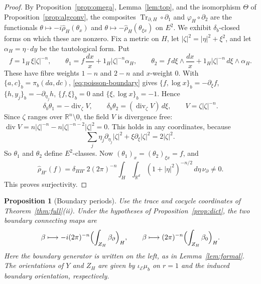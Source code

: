\documentclass[11pt,oneside,reqno]{article}
\DeclareMathOperator{\Tr}{Tr}
\theoremstyle{plain}
\newtheorem{proposition}[theorem]{Proposition}
\theoremstyle{definition}
\theoremstyle{remark}
\begin{document}
\begin{proof}
By Proposition~\ref{prop:omega}, Lemma~\ref{lem:top}, and the isomorphism
\(\Theta\) of Proposition~\ref{prop:algconv}, the composites
\(\Tr_{\partial,H}\circ\partial_1\) and \(\varphi_H\circ\partial_2\) are the
functionals \(\theta\mapsto-i\hat\rho_H(\theta_x)\) and
\(\theta\mapsto-\hat\rho_H(\theta_{\xi x})\) on \(E^2\). We exhibit
\(\delta_b\)-closed forms on which these are nonzero. Fix a metric on
\(H\), let \(|\zeta|^2=|\eta|^2+\xi^2\), and let \(\alpha_H=\eta\cdot dy\) be
the tautological form. Put
\[
 f=1_H\,\xi|\zeta|^{-n},\qquad
 \theta_1=f\,\frac{dx}{x}+1_H|\zeta|^{-n}\alpha_H,\qquad
 \theta_2=f\,d\xi\wedge\frac{dx}{x}+1_H|\zeta|^{-n}\,d\xi\wedge\alpha_H .
\]
These have fibre weights \(1-n\) and \(2-n\) and \(x\)-weight \(0\). With
\(\{a,c\}_b=\pi_b(da,dc)\), \eqref{eq:poisson-boundary} gives
\(\{f,\log x\}_b=-\partial_\xi f\), \(\{h,y_j\}_b=-\partial_{\eta_j}h\),
\(\{f,\xi\}_b=0\) and \(\{\xi,\log x\}_b=-1\). Hence
\[
 \delta_b\theta_1=-\operatorname{div}_\zeta V,\qquad
 \delta_b\theta_2=(\operatorname{div}_\zeta V)\,d\xi,\qquad
 V=\zeta|\zeta|^{-n}.
\]
Since \(\zeta\) ranges over \(\mathbb R^n\setminus0\), the field \(V\) is
divergence free:
\(\operatorname{div}V=n|\zeta|^{-n}-n|\zeta|^{-n-2}|\zeta|^2=0\). This holds
in any coordinates, because
\[
 \sum_j\eta_j\partial_{\eta_j}|\zeta|^2+\xi\partial_\xi|\zeta|^2=2|\zeta|^2 .
\]
So \(\theta_1\) and \(\theta_2\) define
\(E^2\)-classes. Now \((\theta_1)_x=(\theta_2)_{\xi x}=f\), and
\[
 \hat\rho_{H'}(f)=\delta_{HH'}\,2(2\pi)^{-n}\int_H\int_{\mathbb R^d}
 (1+|\eta|^2)^{-n/2}\,d\eta\,\nu_\partial\neq0 .
\]
This proves surjectivity.
\end{proof}

\begin{proposition}[Boundary periods]\label{prop:description}
Use the trace and cocycle coordinates of Theorem~\ref{thm:full}(ii).
Under the hypotheses of Proposition~\ref{prop:dict}, the two boundary
connecting maps are
\[
 \beta\longmapsto -i(2\pi)^{-n}\Bigl(\int_{Z_H}\beta_\partial\Bigr)_H,
 \qquad
 \beta\longmapsto (2\pi)^{-n}\Bigl(\int_{Z_H}\beta_0\Bigr)_H .
\]
Here the boundary generator is written on the left, as in
Lemma~\ref{lem:formal}. The orientations of \(Y\) and \(Z_H\) are
given by \(\iota_{\mathcal E}\mu_b\) on \(r=1\) and the induced
boundary orientation, respectively.
\end{proposition}
\end{document}
